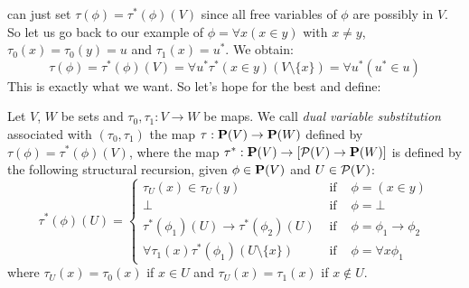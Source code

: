 can just set $\tau(\phi)=\tau^{*}(\phi)(V)$ since all free variables
of $\phi$ are possibly in $V$. So let us go back to our example of
$\phi=\forall x(x\in y)$ with $x\neq y$, $\tau_{0}(x)=\tau_{0}(y)=u$
and $\tau_{1}(x)=u^{*}$. We obtain:
    \[
    \tau(\phi)=\tau^{*}(\phi)(V)=\forall u^{*}\tau^{*}(x\in
    y)(V\setminus\{x\})=\forall u^{*}(u^{*}\in u)
    \]
This is exactly what we want. So let's hope for the best and define:
\begin{defin}\label{logic:def:FOPL:dualsubst:dualsubst}
Let $V$, $W$ be sets and $\tau_{0}, \tau_{1}:V\to W$ be maps. We
call {\em dual variable substitution} associated with
$(\tau_{0},\tau_{1})$ the map $\tau:\mbox{${\bf P}(V)$}\to {\bf P}(W)$ defined by
$\tau(\phi)=\tau^{*}(\phi)(V)$, where the map $\tau^{*}:\mbox{${\bf P}(V)$}\to[{\cal
P}(V)\to{\bf P}(W)]$ is defined by the following structural
recursion, given $\phi\in\mbox{${\bf P}(V)$}$ and $U\in{\cal P}(V)$:
    \begin{equation}\label{logic:eqn:FOPL:dualsubst:dualsubst:1}
                    \tau^{*}(\phi)(U)=\left\{
                    \begin{array}{lcl}
                    \tau_{U}(x)\in\tau_{U}(y)&\mbox{\ if\ }&\phi=(x\in y)\\
                    \bot&\mbox{\ if\ }&\phi=\bot\\
                    \tau^{*}(\phi_{1})(U)\to\tau^{*}(\phi_{2})(U)
                    &\mbox{\ if\ }&\phi=\phi_{1}\to\phi_{2}\\
                    \forall\tau_{1}(x)\tau^{*}(\phi_{1})(U\setminus\{x\})&
                    \mbox{\ if\ }&\phi=\forall x\phi_{1}
                    \end{array}\right.
    \end{equation}
where $\tau_{U}(x)=\tau_{0}(x)$ if $x\in U$ and
$\tau_{U}(x)=\tau_{1}(x)$ if $x\not\in U$.
\end{defin}

